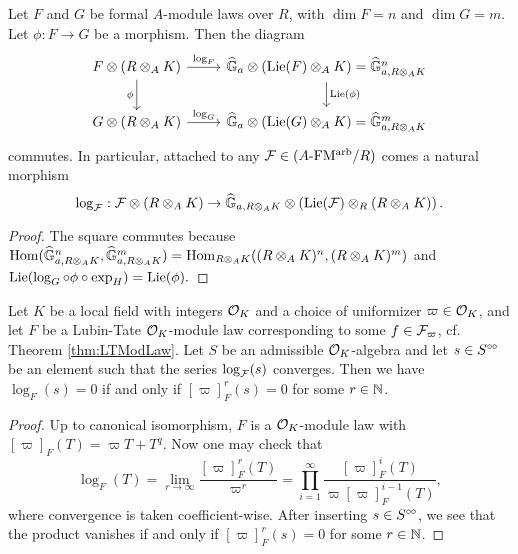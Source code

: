 \documentclass[../main.tex]{subfiles}
\begin{document}
\begin{lem}
  Let $F$ and $G$ be formal $A$-module laws over $R$, with $\dim F = n$ and
  $\dim G = m$. 
  Let $\phi: F \to G$ be a morphism. Then the diagram 
  \begin{equation*}
  \begin{tikzcd}[ampersand replacement=\&]
    {F \otimes(R \otimes_A K)} \& {\Ghat_a \otimes (\Lie(F)} \otimes_A K) =
    \Ghat_{a, R\otimes_AK}^n \\
    {G \otimes(R \otimes_A K)} \& {\Ghat_a \otimes (\Lie(G)} \otimes_A K) =
    \Ghat_{a, R\otimes_AK}^m
  	\arrow["{\log_F}", from=1-1, to=1-2]
  	\arrow["\phi"', from=1-1, to=2-1]
  	\arrow["{\Lie(\phi)}", from=1-2, to=2-2]
  	\arrow["{\log_G}", from=2-1, to=2-2]
  \end{tikzcd}
  \end{equation*}
  commutes. In particular, attached to any $\mathcal{F} \in {({A}\text-\allowbreak\mathrm{FM^{arb}}/{R})}$ comes a 
  natural morphism 
  $$\log_{\mathcal{F}}: \mathcal{F} \otimes (R \otimes_A K) \to \widehat{\mathbb{G}}_{a, R\otimes_A K} \otimes
  \left(\operatorname{Lie}(\mathcal{F}) \otimes_R (R \otimes_A K)\right).$$
  \begin{proof}
    The square commutes because $\operatorname{Hom}(\widehat{\mathbb{G}}_{a, R\otimes_AK}^n, \widehat{\mathbb{G}}_{a,
    R\otimes_AK}^m) = \operatorname{Hom}_{R \otimes_A K}((R\otimes_A K)^n, (R\otimes_A K)^m)$
    and $\operatorname{Lie}(\log_G \circ \phi \circ \exp_H) = \operatorname{Lie}(\phi).$
  \end{proof}
\end{lem}

\begin{lem}\label{lem:KernelOfLog}
  Let $K$ be a local field with integers $\mathcal{O}_K$ and a choice of uniformizer $\varpi \in \mathcal{O}_K$, 
  and let $F$ be a Lubin-Tate $\mathcal{O}_K$-module law corresponding to some 
  $f \in \mathcal{F}_\varpi$, cf. Theorem \ref{thm:LTModLaw}. Let $S$ be an admissible 
  $\mathcal{O}_K$-algebra and let $s \in S^{\circ \hspace{-0.5pt} \circ}$ be an element such that the
  series $\log_{\mathcal{F}}(s)$ 
  converges. Then we have $\log_F(s) = 0$ if and only if $[\varpi]^r_F(s) = 0$ for
  some $r \in \mathbb{N}$. 
\begin{proof}
  Up to canonical isomorphism, $F$ is a $\mathcal{O}_K$-module law with $[\varpi]_F(T) =
  \varpi T + T^q$. Now one may check that 
  \begin{equation*}
    \log_F(T) = \lim_{r \to \infty} \frac{ [\varpi]_F^r(T) }{\varpi^r} = \prod_{i=1}^\infty 
    \frac{[\varpi]^i_F(T)}{\varpi [\varpi]^{i-1}_F(T)},
  \end{equation*}
  where convergence is taken coefficient-wise. After inserting
  $s \in S^{\circ \hspace{-0.5pt} \circ}$, we see that the product vanishes if and only if $[\varpi]_F^r(s) = 0$
  for some $r \in \mathbb{N}$. 
\end{proof}
\end{lem}
\end{document}

